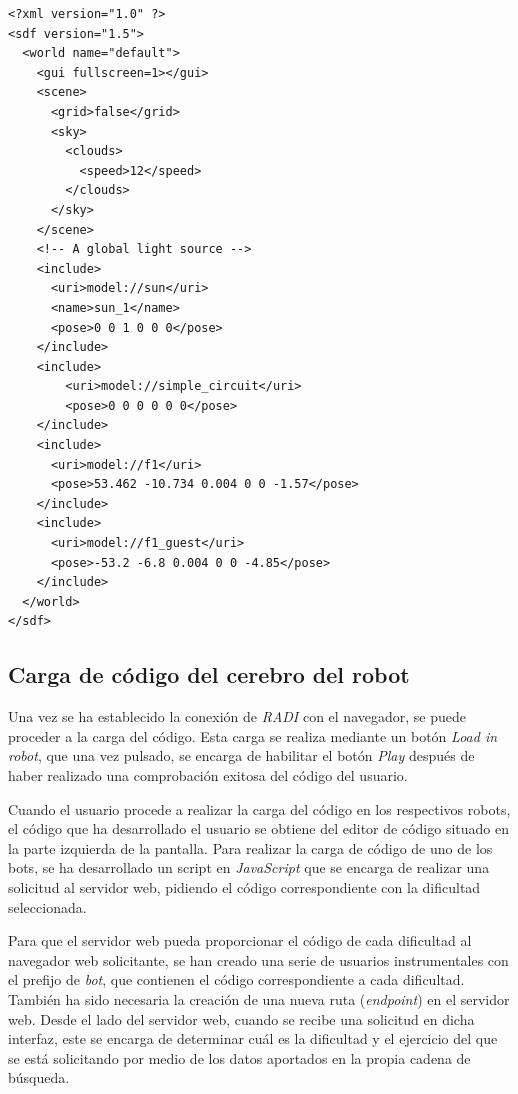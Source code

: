 \documentclass[a4paper, 12pt]{book}
\begin{document}
\begin{lstlisting}
<?xml version="1.0" ?>
<sdf version="1.5">
  <world name="default">
    <gui fullscreen=1></gui>
    <scene>
      <grid>false</grid>
      <sky>
        <clouds>
          <speed>12</speed>
        </clouds>
      </sky>
    </scene>
    <!-- A global light source -->
    <include>
      <uri>model://sun</uri>
      <name>sun_1</name>
      <pose>0 0 1 0 0 0</pose>
    </include>
    <include>
	    <uri>model://simple_circuit</uri>
	    <pose>0 0 0 0 0 0</pose>
    </include>
    <include>
      <uri>model://f1</uri>
      <pose>53.462 -10.734 0.004 0 0 -1.57</pose>
    </include>
    <include>
      <uri>model://f1_guest</uri>
      <pose>-53.2 -6.8 0.004 0 0 -4.85</pose>
    </include>
  </world>
</sdf>
\end{lstlisting}

\subsection{Carga de código del cerebro del robot}
\label{follow_line_game_code_load}

Una vez se ha establecido la conexión de \emph{RADI} con el navegador, se puede proceder a la carga del código. Esta carga se realiza mediante un botón \emph{Load in robot}, que una vez pulsado, se encarga de habilitar el botón \emph{Play} después de haber realizado una comprobación exitosa del código del usuario.

Cuando el usuario procede a realizar la carga del código en los respectivos robots, el código que ha desarrollado el usuario
se obtiene del editor de código situado en la parte izquierda de la pantalla. Para realizar la carga de código de uno de los bots, se ha desarrollado un script en \emph{JavaScript} que se encarga de realizar una solicitud al servidor web, pidiendo el código correspondiente con la dificultad seleccionada.

Para que el servidor web pueda proporcionar el código de cada dificultad al navegador web solicitante, se han creado una serie de usuarios instrumentales con el prefijo de \emph{bot}, que contienen el código correspondiente a cada dificultad. También ha sido necesaria la creación de una nueva ruta (\emph{endpoint}) en el servidor web. Desde el lado del servidor web, cuando se recibe una solicitud en dicha interfaz, este se encarga de determinar cuál es la dificultad y el ejercicio del que se está solicitando por medio de los datos aportados en la propia cadena de búsqueda.
\end{document}

